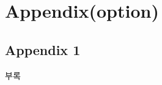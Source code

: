 \documentclass[11pt]{report}
\begin{document}
\cleardoublepage
{}  
% 
%

\chapter*{Appendix(option)}

\section*{Appendix 1}
부록

% 
%
\begin{KUabstractKO}
\jiwon[2-4]
\end{KUabstractKO}




\cleardoublepage
\end{document}
